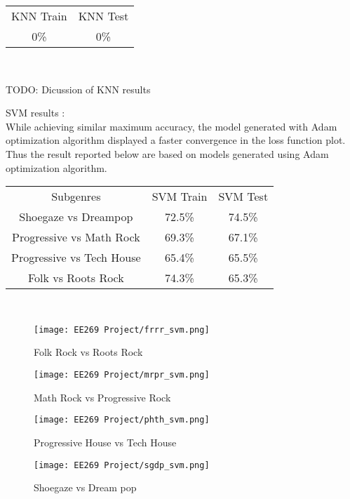 \documentclass[letterpaper, 12 pt, conference]{ieeeconf}  %
\begin{document}
\begin{center}
    \begin{tabular}{ |c|c| }
 KNN Train & KNN Test  \\ 
 0\% & 0\% \\

\end{tabular}\\

\end{center}

\par TODO: Dicussion of KNN results
\newline \,\,


\par SVM results :\\
\quad While achieving similar maximum accuracy, the model generated with Adam optimization algorithm displayed a faster convergence in the loss function plot. Thus the result reported below are based on models generated using Adam optimization algorithm.

\begin{center}
    
    \begin{tabular}{ |c|c|c| }
 Subgenres & SVM Train & SVM Test \\ 
 Shoegaze vs Dreampop & 72.5\% & 74.5\% \\
 Progressive vs Math Rock & 69.3\% & 67.1\% \\
 Progressive vs Tech House & 65.4\% & 65.5\% \\
 Folk vs Roots Rock & 74.3\% & 65.3\% \\
\end{tabular}\\
\end{center}
\begin{figure}[t]
\texttt{[image: EE269 Project/frrr\_svm.png]}
\caption{Folk Rock vs Roots Rock}
\end{figure}
\begin{figure}
\texttt{[image: EE269 Project/mrpr\_svm.png]}
\caption{Math Rock vs Progressive Rock}
\end{figure}
\begin{figure}
\texttt{[image: EE269 Project/phth\_svm.png]}
\caption{Progressive House vs Tech House}
\end{figure}
\begin{figure}
\texttt{[image: EE269 Project/sgdp\_svm.png]}
\caption{Shoegaze vs Dream pop}
\end{figure}
\end{document}
